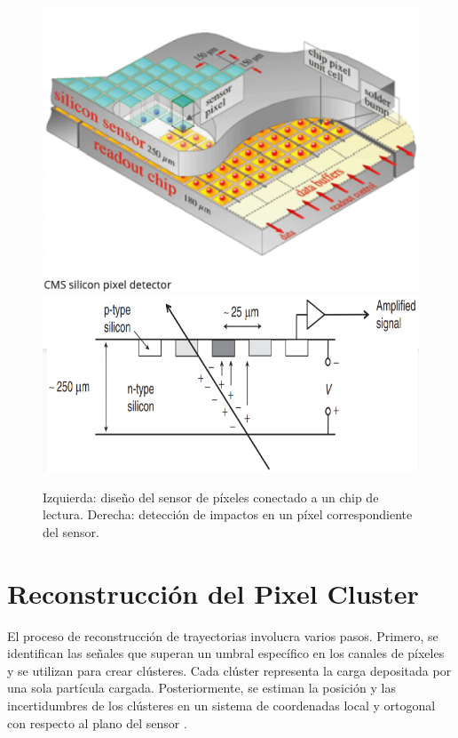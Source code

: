 \begin{center}
  \begin{figure}[h]
    \centering
    \includegraphics[scale=.3]{Chapter2/PixelSensor.png} \includegraphics[scale=.3]{Chapter2/hit.png}
    \caption[Vista esquemática de un sensor de píxeles y su conexión a los canales de lectura]{Izquierda: diseño del sensor de píxeles conectado a un chip de lectura. Derecha: detección de impactos en un píxel correspondiente del sensor.}
    \label{module and hit}
  \end{figure}
\end{center}

\section{Reconstrucción del Pixel Cluster}

El proceso de reconstrucción de trayectorias involucra varios pasos. Primero, se identifican las señales que superan un umbral específico en los canales de píxeles y se utilizan para crear clústeres. Cada clúster representa la carga depositada por una sola partícula cargada. Posteriormente, se estiman la posición y las incertidumbres de los clústeres en un sistema de coordenadas local y ortogonal con respecto al plano del sensor \cite{Track_Reco_2014}.\\

